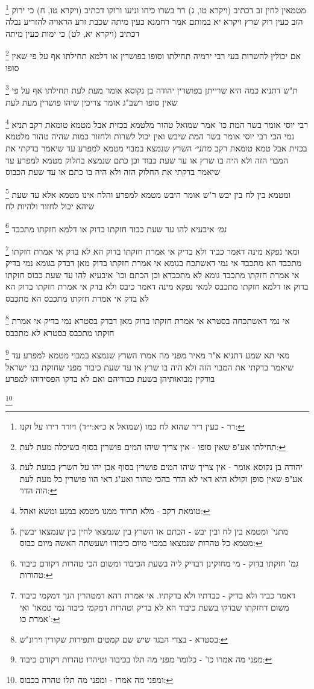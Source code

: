 \documentclass[12pt, openany]{book}
\newcommand{\footnotecomment}[1]{
	\renewcommand\thefootnote{}
	\footnote{#1}}
\newcommand{\commenta}[1]{\footnotecomment{#1}}
\begin{document}
{\commenta{רר - כעין ריר שהוא לח כמו (שמואל א כ״א:י״ד) ויורד רירו על זקנו:}
מטמאין לחין זב דכתיב (ויקרא טו, ג) רר בשרו כיחו וניעו ורוקו דכתיב (ויקרא טו, ח) כי ירוק הזב כעין רוק 
שרץ {ויקרא יא } במותם אמר רחמנא כעין מיתה שכבת זרע הראויה להזריע נבלה דכתיב (ויקרא יא, לט) כי ימות כעין מיתה
\commenta{תחילתו אע"פ שאין סופו - אין צריך שיהו המים פושרין בסוף כשיכלה מעת לעת:}
אם יכולין להשרות בעי רבי ירמיה תחילתו וסופו בפושרין או דלמא תחילתו אף על פי שאין סופו 
\commenta{יהודה בן נקוסא אומר - אין צריך שיהו המים פושרין בסוף אכן יהו על השרץ כמעת לעת אע"פ שאין סופן וקולא היא דאי לא הדר בהכי טהור ואע"ג דאי הוו פושרין כל מעת לעת הוה הדר:}
ת"ש דתניא כמה היא שרייתן בפושרין יהודה בן נקוסא אומר מעת לעת תחילתו אף על פי שאין סופו רשב"ג אומר צריכין שיהו פושרין מעת לעת
\commenta{טומאת רקב - מלא תרווד ממנו מטמא במגע ומשא ואהל:}
רבי יוסי אומר בשר המת כו' אמר שמואל טהור מלטמא בכזית אבל מטמא טומאת רקב תניא נמי הכי רבי יוסי אומר בשר המת שיבש ואין יכול לשרות ולחזור כמות שהיה טהור מלטמא בכזית אבל טמא טומאת רקב
{\large\emph{מתני׳}} השרץ שנמצא במבוי מטמא למפרע עד שיאמר בדקתי את המבוי הזה ולא היה בו שרץ או עד שעת כבוד
וכן כתם שנמצא בחלוק מטמא למפרע עד שיאמר בדקתי את החלוק הזה ולא היה בו כתם או עד שעת הכבוס 
\commenta{מתני' ומטמא בין לח ובין יבש - הכתם או השרץ בין שנמצאו לחין בין שנמצאו יבשין מטמא כל טהרות שנמצאו במבוי מיום כיבודו ושעשתה האשה מיום כבוס:}
ומטמא בין לח בין יבש ר"ש אומר היבש מטמא למפרע והלח אינו מטמא אלא עד שעת שיהא יכול לחזור ולהיות לח
\commenta{גמ' חזקתו בדוק - מי מחזקינן דבדיק ליה בשעת הכיבוד ומשום הכי טהרות דקודם כיבוד טהורות:}
{\large\emph{גמ׳}} איבעיא להו עד שעת כבוד חזקתו בדוק או דלמא חזקתו מתכבד 
\commenta{דאמר כביד ולא בדיק - כבדתיו ולא בדקתיו. אי אמרת דהא דמטהרין הנך דמקמי כיבוד משום דחזקתו שבדקו בשעת כיבוד הא לא בדיק וטהרות דמקמי כיבוד נמי טמאו' ואי אמרת כו':}
ומאי נפקא מינה דאמר כביד ולא בדיק אי אמרת חזקתו בדוק הא לא בדק אי אמרת חזקתו מתכבד הא מתכבד
אי נמי דאשתכח בגומא אי אמרת חזקתו בדוק מאן דבדק בגומא נמי בדיק אי אמרת חזקתו מתכבד גומא לא מתכבדא
וכן הכתם וכו' איבעיא להו עד שעת כבוס חזקתו בדוק או דלמא חזקתו מתכבס 
למאי נפקא מינה דאמר כיבס ולא בדק אי אמרת חזקתו בדוק הא לא בדק אי אמרת חזקתו מתכבס הא מתכבס 
\commenta{בסטרא - בצדי הבגד שיש שם קמטים ותפירות שקורין וירונ"ש:}
אי נמי דאשתכחה בסטרא אי אמרת חזקתו בדוק מאן דבדק בסטרא נמי בדיק אי אמרת חזקתו מתכבס בסטרא לא מתכבס 
\commenta{מפני מה אמרו כו' - כלומר מפני מה תלו בכיבוד וטיהרו טהרות דקודם כיבוד:}
מאי תא שמע דתניא א"ר מאיר מפני מה אמרו השרץ שנמצא במבוי מטמא למפרע עד שיאמר בדקתי את המבוי הזה ולא היה בו שרץ או עד שעת כיבוד מפני שחזקת בני ישראל בודקין מבואותיהן בשעת כבודיהם ואם לא בדקו הפסידוהו למפרע 
\commenta{ומפני מה אמרו - ומפני מה תלו טהרה בכבוס:}
}
\end{document}
